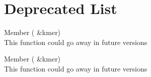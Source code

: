 \chapter{Deprecated List}
\hypertarget{deprecated}{}\label{deprecated}

\begin{DoxyRefList}
\item[Member \doxylink{Kmer_8cpp_a77194578942a94dd58a0d5721ffa89d4}{To\+Lower} (\doxylink{classKmer}{Kmer} \&kmer)]\hfill \\
\label{deprecated__deprecated000001}%
%
This function could go away in future versions  
\item[Member \doxylink{Kmer_8cpp_a529f93b76b54a04d3d72be14476cd38e}{To\+Upper} (\doxylink{classKmer}{Kmer} \&kmer)]\hfill \\
\label{deprecated__deprecated000002}%
%
This function could go away in future versions 
\end{DoxyRefList}